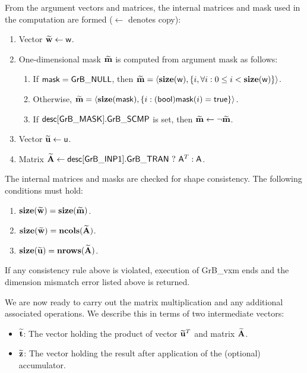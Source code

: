 From the argument vectors and matrices, the internal matrices and mask used in 
the computation are formed ($\leftarrow$ denotes copy):
\begin{enumerate}
	\item Vector ${\bf \widetilde{w}} \leftarrow {\sf w}$.

	\item One-dimensional mask ${\bf \widetilde{m}}$ is computed from 
    argument {\sf mask} as follows:
	\begin{enumerate}
		\item	If ${\sf mask} = {\sf GrB\_NULL}$, then ${\bf \widetilde{m}} = 
        \langle \bold{size}({\sf w}), \{i, \forall i : 0 \leq i < 
        \bold{size}({\sf w}) \} \rangle$.

		\item	Otherwise, ${\bf \widetilde{m}} = 
        \langle \bold{size}({\sf mask}), \{i : ({\sf bool}){\sf mask}(i) = 
        {\sf true}\} \rangle$.

		\item	If ${\sf desc[GrB\_MASK].GrB\_SCMP}$ is set, then ${\bf \widetilde{m}} \leftarrow \neg {\bf \widetilde{m}}$.
	\end{enumerate}

	\item Vector ${\bf \widetilde{u}} \leftarrow {\sf u}$.

	\item Matrix ${\bf \widetilde{A}} \leftarrow {\sf desc[GrB\_INP1].GrB\_TRAN} \ ? \ {\sf A}^T : {\sf A}$.
\end{enumerate}

The internal matrices and masks are checked for shape consistency. The following 
conditions must hold:
\begin{enumerate}
	\item $\bold{size}({\bf \widetilde{w}}) = \bold{size}({\bf \widetilde{m}})$.

	\item $\bold{size}({\bf \widetilde{w}}) = \bold{ncols}({\bf \widetilde{A}})$.

	\item $\bold{size}({\bf \widetilde{u}}) = \bold{nrows}({\bf \widetilde{A}})$.
\end{enumerate}
If any consistency rule above is violated, execution of {\sf GrB\_vxm} ends and 
the dimension mismatch error listed above is returned.

We are now ready to carry out the matrix multiplication and any additional 
associated operations.  We describe this in terms of two intermediate vectors:
\begin{itemize}
	\item ${\bf \widetilde{t}}$: The vector holding the product of vector
    ${\bf \widetilde{u}}^T$ and matrix ${\bf \widetilde{A}}$.
	\item ${\bf \widetilde{z}}$: The vector holding the result after 
    application of the (optional) accumulator.
\end{itemize}

